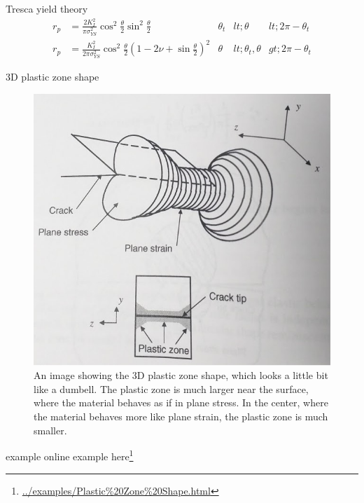 \documentclass[
  letterpaper,
  ignorenonframetext,
  aspectratio=43,
  handout,
  12pt]{beamer}
\DeclareRobustCommand{\href}[2]{#2\footnote{\url{#1}}}
\let\Oldincludegraphics\includegraphics
\renewcommand{\includegraphics}[2][]{\Oldincludegraphics[width=\textwidth,height=0.7\textheight,keepaspectratio]{#2}}
\begin{document}
\begin{frame}{Tresca yield theory}
\protect\hypertarget{tresca-yield-theory-4}{}
\[\begin{aligned}
  r_p &= \frac{2 K_I^2}{\pi \sigma_{YS}^2} \cos^2 \frac{\theta}{2} \sin^2 \frac{\theta}{2} & \theta_t &lt; \theta &lt; 2\pi - \theta_t\\
  r_p &= \frac{K_I^2}{2\pi \sigma_{YS}^2}\cos^2 \frac{\theta}{2}\left(1 - 2\nu + \sin \frac{\theta}{2}\right)^2 & \theta &lt; \theta_t, \theta &gt; 2\pi - \theta_t
\end{aligned}\]
\end{frame}

\begin{frame}{3D plastic zone shape}
\protect\hypertarget{d-plastic-zone-shape}{}
\begin{figure}
\centering
\includegraphics{../images/dumbell.png}
\caption{An image showing the 3D plastic zone shape, which looks a
little bit like a dumbell. The plastic zone is much larger near the
surface, where the material behaves as if in plane stress. In the
center, where the material behaves more like plane strain, the plastic
zone is much smaller.}
\end{figure}
\end{frame}

\begin{frame}{example}
\protect\hypertarget{example-3}{}
online example \href{../examples/Plastic\%20Zone\%20Shape.html}{here}
\end{frame}
\end{document}
